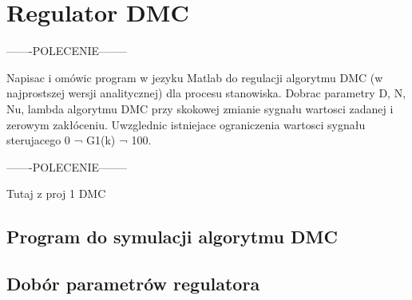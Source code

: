 \section{Regulator DMC}


-------POLECENIE--------

Napisac i omówic program w jezyku Matlab do regulacji algorytmu DMC (w najprostszej
wersji analitycznej) dla procesu stanowiska. Dobrac parametry D, N, Nu, lambda
algorytmu DMC przy skokowej zmianie sygnału wartosci zadanej i zerowym zakłóceniu.
Uwzglednic istniejace ograniczenia wartosci sygnału sterujacego 0 ¬ G1(k) ¬ 100.

-------POLECENIE--------

Tutaj z proj 1 DMC

\subsection{Program do symulacji algorytmu DMC}

\subsection{Dobór parametrów regulatora}
